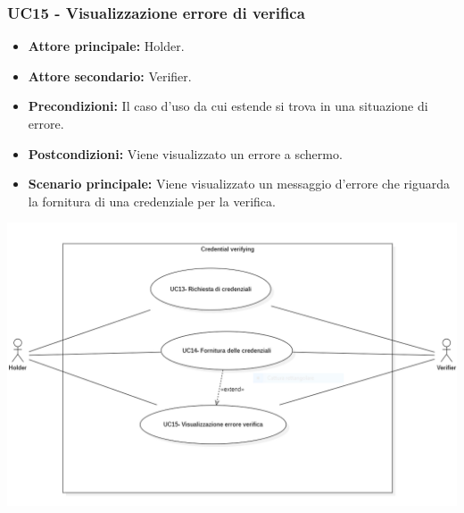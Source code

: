 \subsubsection{UC15 - Visualizzazione errore di verifica}
\begin{itemize}
    \item \textbf{Attore principale:} Holder.
    \item \textbf{Attore secondario:} Verifier.
    \item \textbf{Precondizioni:} Il caso d'uso da cui estende si trova in una situazione di errore.
    \item \textbf{Postcondizioni:} Viene visualizzato un errore a schermo. 
    \item \textbf{Scenario principale:} Viene visualizzato un messaggio d’errore che riguarda la fornitura di una credenziale per la verifica.
\end{itemize}

\begin{center}
    \includegraphics[scale = 0.65]{./res/img/UC4.PNG}
  \end{center}